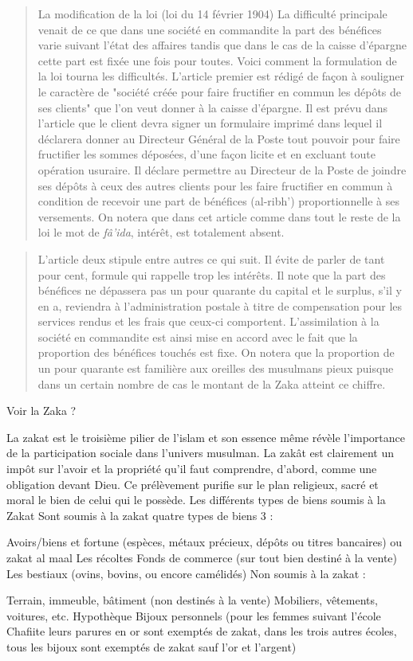 \begin{quote}
    La modification de la loi (loi du 14 février 1904)
La difficulté principale venait de ce que dans une société en commandite la
part des bénéfices varie suivant l'état des affaires tandis que dans le cas de la
caisse d'épargne cette part est fixée une fois pour toutes. Voici comment la
formulation de la loi tourna les difficultés.
L'article premier est rédigé de façon à souligner le caractère de "société créée
pour faire fructifier en commun les dépôts de ses clients" que l'on veut donner à
la caisse d'épargne. Il est prévu dans l'article que le client devra signer un
formulaire imprimé dans lequel il déclarera donner au Directeur Général de la
Poste tout pouvoir pour faire fructifier les sommes déposées, d'une façon licite et
en excluant toute opération usuraire. Il déclare permettre au Directeur de la Poste
de joindre ses dépôts à ceux des autres clients pour les faire fructifier en commun
à condition de recevoir une part de bénéfices (al-ribh') proportionnelle à ses
versements. On notera que dans cet article comme dans tout le reste de la loi le
mot de \textit{fâ'ida}, intérêt, est totalement absent.
\end{quote}

\begin{quote}
    L'article deux stipule entre autres ce qui suit. Il évite de parler de tant pour
cent, formule qui rappelle trop les intérêts. Il note que la part des bénéfices ne
dépassera pas un pour quarante du capital et le surplus, s'il y en a, reviendra à
l'administration postale à titre de compensation pour les services rendus et les
frais que ceux-ci comportent. L'assimilation à la société en commandite est ainsi
mise en accord avec le fait que la proportion des bénéfices touchés est fixe. On
notera que la proportion de un pour quarante est familière aux oreilles des
musulmans pieux puisque dans un certain nombre de cas le montant de la Zaka
atteint ce chiffre.
\end{quote}

Voir la Zaka ?

\begin{Def}[Zakat]
La zakat est le troisième pilier de l'islam et son essence même révèle l'importance de la participation sociale dans l'univers musulman. La zakât est clairement un impôt sur l'avoir et la propriété qu'il faut comprendre, d'abord, comme une obligation devant Dieu. Ce prélèvement purifie sur le plan religieux, sacré et moral le bien de celui qui le possède.
Les différents types de biens soumis à la Zakat
Sont soumis à la zakat quatre types de biens 3 :

Avoirs/biens et fortune (espèces, métaux précieux, dépôts ou titres bancaires) ou zakat al maal
Les récoltes
Fonds de commerce (sur tout bien destiné à la vente)
Les bestiaux (ovins, bovins, ou encore camélidés)
Non soumis à la zakat :

Terrain, immeuble, bâtiment (non destinés à la vente)
Mobiliers, vêtements, voitures, etc.
Hypothèque
Bijoux personnels (pour les femmes suivant l'école Chafiite leurs parures en or sont exemptés de zakat, dans les trois autres écoles, tous les bijoux sont exemptés de zakat sauf l'or et l'argent)
\end{Def}

